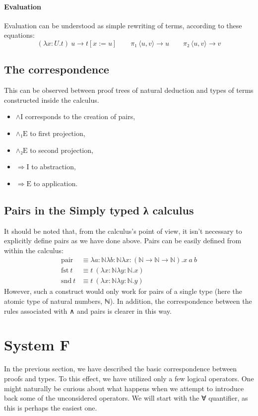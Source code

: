 \documentclass[12pt]{article}
\begin{document}
\paragraph{Evaluation}
Evaluation can be understood as simple rewriting of terms, according to these equations:
\[(λx:U.t) \ u → t[x:=u] \qquad π₁ \ ⟨u,v⟩ → u \qquad π₂ \ ⟨u,v⟩ → v\]
\subsection{The correspondence}
This can be observed between proof trees of natural deduction and types of terms constructed inside the calculus.
\begin{itemize}
    \item $\mathrm{∧I}$ corresponds to the creation of pairs,
    \item $\mathrm{∧₁E}$ to first projection,
    \item $\mathrm{∧₂E}$ to second projection,
    \item $\mathrm{⇒I}$ to abstraction,
    \item $\mathrm{⇒E}$ to application.
\end{itemize}
\subsection{Pairs in the Simply typed λ calculus}
\label{crappairs}
It should be noted that, from the calculus's point of view, it isn't necessary to explicitly define pairs as we have done above. Pairs can be easily defined from within the calculus:
\begin{align*}
    \mathrm{pair} &≡ λa:ℕλb:ℕλx:(ℕ → ℕ → ℕ).x \ a \ b\\
    \mathrm{fst} \ t &≡ t \ (λx:ℕλy:ℕ.x)\\
    \mathrm{snd} \ t &≡ t \ (λx:ℕλy:ℕ.y)
\end{align*}
However, such a construct would only work for pairs of a single type (here the atomic type of natural numbers, ℕ). In addition, the correspondence between the rules associated with ∧ and pairs is clearer in this way.

\section{System F}
In the previous section, we have described the basic correspondence between proofs and types. To this effect, we have utilized only a few logical operators. One might naturally be curious about what happens when we attempt to introduce back some of the unconsidered operators. We will start with the ∀ quantifier, as this is perhaps the easiest one.
\end{document}
